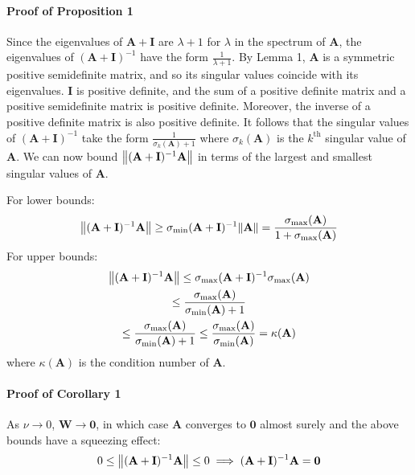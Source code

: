 \documentclass[mnsc,blindrev]{informs3}
\begin{document}
        \paragraph{Proof of Proposition 1}
            Since the eigenvalues of $\mathbf{A} + \mathbf{I}$ are $\lambda + 1$ for $\lambda$ in the spectrum of $\mathbf{A}$, the eigenvalues of $(\mathbf{A} + \mathbf{I})^{-1}$ have the form $\frac{1}{\lambda + 1}$. By Lemma 1, $\mathbf{A}$ is a symmetric positive semidefinite matrix, and so its singular values coincide with its eigenvalues. $\mathbf{I}$ is positive definite, and the sum of a positive definite matrix and a positive semidefinite matrix is positive definite. Moreover, the inverse of a positive definite matrix is also positive definite.  It follows that the singular values of $(\mathbf{A} + \mathbf{I})^{-1}$ take the form $\frac{1}{\sigma_k(\mathbf{A}) + 1}$ where $\sigma_k(\mathbf{A})$ is the $k^{\text{th}}$ singular value of $\mathbf{A}$. We can now bound $\norm{(\mathbf{A} + \mathbf{I})^{-1}\mathbf{A}}$ in terms of the largest and smallest singular values of $\mathbf{A}$. 
    
            For lower bounds:
            \begin{gather*}
                \norm{(\mathbf{A} + \mathbf{I})^{-1}\mathbf{A}} \geq \sigma_{\min}{(\mathbf{A} + \mathbf{I})^{-1}} \norm{\mathbf{A}} 
                = \frac{\sigma_{\max}(\mathbf{A})}{1 + \sigma_{\max}(\mathbf{A})} %
            \end{gather*}
            For upper bounds:
            \begin{gather*}
                \norm{(\mathbf{A} + \mathbf{I})^{-1}\mathbf{A}} \leq \sigma_{\max}{(\mathbf{A} + \mathbf{I})^{-1}} \sigma_{\max}(\mathbf{A}) \\
                \leq \frac{\sigma_{\max}(\mathbf{A})}{\sigma_{\min}(\mathbf{A})+1} \\
                \leq \frac{\sigma_{\max}(\mathbf{A})}{\sigma_{\min}(\mathbf{A})+1}
                \leq \frac{\sigma_{\max}(\mathbf{A})}{\sigma_{\min}(\mathbf{A})} = \kappa(\mathbf{A})
            \end{gather*}
            where $\kappa(\mathbf{A})$ is the condition number of $\mathbf{A}$. 
    
        \paragraph{Proof of Corollary 1}
            As $\nu \rightarrow 0$, $\mathbf{W} \rightarrow \mathbf{0}$, in which case $\mathbf{A}$ converges to $\mathbf{0}$ almost surely and the above bounds have a squeezing effect:
            \begin{equation*}
                0 \leq \norm{(\mathbf{A} + \mathbf{I})^{-1}\mathbf{A}} \leq 0 \implies (\mathbf{A} + \mathbf{I})^{-1}\mathbf{A} = \mathbf{0}
            \end{equation*}
    
\end{document}
